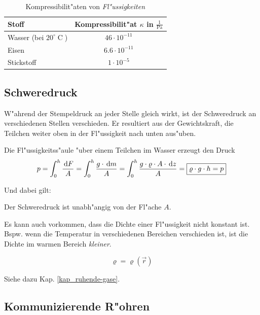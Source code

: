 \begin{table}
   \centering
   \begin{tabular}{l c}
      \toprule
\textbf{Stoff} & Kompressibilit"at $\kappa$ in
$\frac{1}{\operatorname{Pa}}$\\
\midrule
Wasser (bei $20^\circ\operatorname{C}$) & $46 \cdot 10^{-11}$\\
Eisen & $6.6 \cdot 10^{-11}$\\
Stickstoff & $1 \cdot 10^{-5}$\\
\bottomrule
   \end{tabular}
   \caption{Kompressibilit"aten von \emph{Fl"ussigkeiten}}
   \label{tab_kompressibilitaeten_fluessigkeit}
\end{table}




\subsection{Schweredruck}
\label{kap_schweredruck}



W"ahrend der Stempeldruck an jeder Stelle gleich wirkt, ist der
Schweredruck an verschiedenen Stellen verschieden. Er resultiert aus
der Gewichtskraft, die Teilchen weiter oben in der Fl"ussigkeit nach
unten aus"uben.

\begin{Def}
Die Fl"ussigkeitss"aule "uber einem Teilchen im Wasser erzeugt den Druck
\begin{equation}
   \label{eqn_schweredruck}
p = \int_0^h \frac{\, \mathrm{d} F}{A} =
 \int_0^h \frac{g \cdot \, \mathrm{d} m}{A} =
 \int_0^h \frac{g \cdot \varrho \cdot A \cdot \, \mathrm{d} z}{A} =
\boxed{\varrho \cdot g \cdot h = p}
\end{equation}
\end{Def}
Und dabei gilt:
\begin{Wichtig}
   Der Schweredruck ist unabh"angig von der Fl"ache $A$.
\end{Wichtig}

Es kann auch vorkommen, dass die Dichte einer Fl"ussigkeit nicht
konstant ist. Bspw. wenn die Temperatur in verschiedenen Bereichen
verschieden ist, ist die Dichte im warmen Bereich \emph{kleiner}.
\begin{Wichtig}
   $$\varrho = \varrho(\vec r)$$
\end{Wichtig}
Siehe dazu Kap. \ref{kap_ruhende-gase}.


\subsection{Kommunizierende R"ohren}
\label{kap_kommunizierende-rohren}


